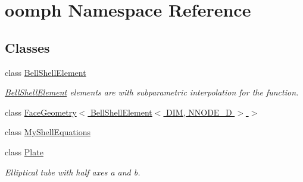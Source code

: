 \hypertarget{namespaceoomph}{}\section{oomph Namespace Reference}
\label{namespaceoomph}
\subsection*{Classes}
\begin{DoxyCompactItemize}
\item 
class \hyperlink{classoomph_1_1BellShellElement}{Bell\+Shell\+Element}
\begin{DoxyCompactList}\small\item\em \hyperlink{classoomph_1_1BellShellElement}{Bell\+Shell\+Element} elements are with subparametric interpolation for the function. \end{DoxyCompactList}\item 
class \hyperlink{classoomph_1_1FaceGeometry_3_01BellShellElement_3_01DIM_00_01NNODE__1D_01_4_01_4}{Face\+Geometry$<$ Bell\+Shell\+Element$<$ D\+I\+M, N\+N\+O\+D\+E\+\_\+D $>$ $>$}
\item 
class \hyperlink{classoomph_1_1MyShellEquations}{My\+Shell\+Equations}
\item 
class \hyperlink{classoomph_1_1Plate}{Plate}
\begin{DoxyCompactList}\small\item\em Elliptical tube with half axes a and b. \end{DoxyCompactList}\end{DoxyCompactItemize}
